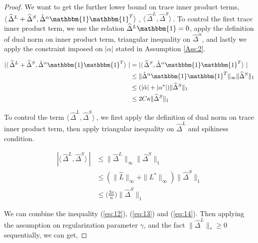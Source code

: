 \documentclass[AMS,STIX1COL]{WileyNJD-v2}
\begin{document}
\begin{proof}
We want to get the further lower bound on trace inner product terms,
$ \langle\, \widehat\Delta^{L} + \widehat\Delta^{S} ,\hat{\Delta}^{\alpha}\mathbbm{1}\mathbbm{1}^T \rangle\ $, $ \langle\, \widehat\Delta^{L}, \widehat\Delta^{S} \rangle\ $. To control the first trace inner product term, we use the relation $\widehat{\Delta}^{L}\mathbbm{1}=0$, apply the definition of dual norm on inner product term, triangular inequality on $\hat{\Delta}^\alpha$, and lastly we apply the constraint imposed on $|\alpha|$ stated in Assumption \ref{Ass:2}.

\begin{align}
    | \langle\, \widehat\Delta^{L} + \widehat\Delta^{S} ,\hat{\Delta}^{\alpha}\mathbbm{1}\mathbbm{1}^T\rangle\ | \nonumber
    &= | \langle\,\widehat\Delta^{S},\hat{\Delta}^{\alpha}\mathbbm{1}\mathbbm{1}^T\rangle\ | \\ \nonumber
    &\leq \|\hat{\Delta}^{\alpha}\mathbbm{1}\mathbbm{1}^T \|_{\infty} \|\widehat{\Delta}^{S}\|_1 \\ \nonumber
    &\leq (|\hat{\alpha}|+|\alpha^{*}|)\|\widehat{\Delta}^{S}\|_1\\
    &\leq 2C\kappa\|\widehat{\Delta}^{S}\|_1  \label{eq:13}
\end{align}

To control the term $ \langle\, \widehat\Delta^{L}, \widehat\Delta^{S} \rangle\ $, we first apply the definition of dual norm on trace inner product term, then apply triangular inequality on $\widehat{\Delta}^{L}$ and spikiness condition.

\begin{align}
    | \langle\, \widehat\Delta^{L}, \widehat\Delta^{S} \rangle\ | \nonumber
    &\leq \|\widehat{\Delta}^{L}\|_{\infty} \|\widehat{\Delta}^{S}\|_1\\ \nonumber
    &\leq (\|\widehat{L}\|_{\infty} + \|L^{*}\|_{\infty})
    \|\widehat{\Delta}^{S} \|_{1}\\
    &\leq \big(\frac{2\kappa}{n}\big)\|\widehat{\Delta}^{S} \|_{1} \label{eq:14}
\end{align}

We can combine the inequality (\ref{eq:12}), (\ref{eq:13}) and (\ref{eq:14}). Then applying the assumption on regularization parameter $\gamma$, and the fact $\|\widehat{\Delta}^{L}\|_{\ast}\geq0$ sequentially, we can get,


\end{proof}
\end{document}
